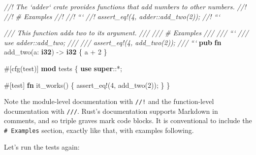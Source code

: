 \documentclass[a4paper,]{book}
\newenvironment{Shaded}{\begin{snugshade}}{\end{snugshade}}
\newcommand{\KeywordTok}[1]{\textcolor[rgb]{0.13,0.29,0.53}{\textbf{{#1}}}}
\newcommand{\DecValTok}[1]{\textcolor[rgb]{0.00,0.00,0.81}{{#1}}}
\newcommand{\CommentTok}[1]{\textcolor[rgb]{0.56,0.35,0.01}{\textit{{#1}}}}
\newcommand{\OtherTok}[1]{\textcolor[rgb]{0.56,0.35,0.01}{{#1}}}
\newcommand{\NormalTok}[1]{{#1}}
\begin{document}
\begin{Shaded}
\begin{Highlighting}[]
\CommentTok{//! The `adder` crate provides functions that add numbers to other numbers.}
\CommentTok{//!}
\CommentTok{//! # Examples}
\CommentTok{//!}
\CommentTok{//! ```}
\CommentTok{//! assert_eq!(4, adder::add_two(2));}
\CommentTok{//! ```}

\CommentTok{/// This function adds two to its argument.}
\CommentTok{///}
\CommentTok{/// # Examples}
\CommentTok{///}
\CommentTok{/// ```}
\CommentTok{/// use adder::add_two;}
\CommentTok{///}
\CommentTok{/// assert_eq!(4, add_two(2));}
\CommentTok{/// ```}
\KeywordTok{pub} \KeywordTok{fn} \NormalTok{add_two(a: }\KeywordTok{i32}\NormalTok{) -> }\KeywordTok{i32} \NormalTok{\{}
    \NormalTok{a + }\DecValTok{2}
\NormalTok{\}}

\OtherTok{#[}\NormalTok{cfg}\OtherTok{(}\NormalTok{test}\OtherTok{)]}
\KeywordTok{mod} \NormalTok{tests \{}
    \KeywordTok{use} \KeywordTok{super}\NormalTok{::*;}

    \OtherTok{#[}\NormalTok{test}\OtherTok{]}
    \KeywordTok{fn} \NormalTok{it_works() \{}
        \OtherTok{assert_eq!}\NormalTok{(}\DecValTok{4}\NormalTok{, add_two(}\DecValTok{2}\NormalTok{));}
    \NormalTok{\}}
\NormalTok{\}}
\end{Highlighting}
\end{Shaded}

Note the module-level documentation with \texttt{//!} and the
function-level documentation with \texttt{///}. Rust's documentation
supports Markdown in comments, and so triple graves mark code blocks. It
is conventional to include the \texttt{\#\ Examples} section, exactly
like that, with examples following.

Let's run the tests again:
\end{document}
